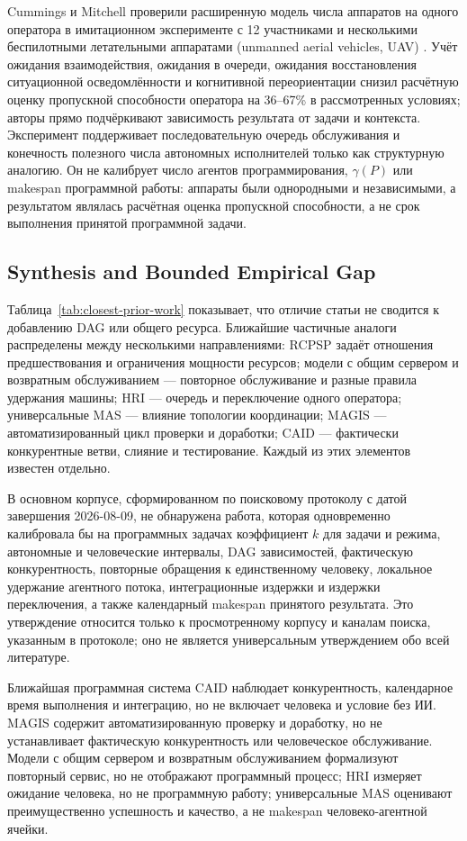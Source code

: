 Cummings и Mitchell проверили расширенную модель числа аппаратов на одного оператора в имитационном эксперименте с 12 участниками и несколькими беспилотными летательными аппаратами (unmanned aerial vehicles, UAV) \cite{cummings2008predicting}. Учёт ожидания взаимодействия, ожидания в очереди, ожидания восстановления ситуационной осведомлённости и когнитивной переориентации снизил расчётную оценку пропускной способности оператора на 36--67\% в рассмотренных условиях; авторы прямо подчёркивают зависимость результата от задачи и контекста. Эксперимент поддерживает последовательную очередь обслуживания и конечность полезного числа автономных исполнителей только как структурную аналогию. Он не калибрует число агентов программирования, $\gamma(P)$ или makespan программной работы: аппараты были однородными и независимыми, а результатом являлась расчётная оценка пропускной способности, а не срок выполнения принятой программной задачи.

\subsection{Synthesis and Bounded Empirical Gap}

Таблица~\ref{tab:closest-prior-work} показывает, что отличие статьи не сводится к добавлению DAG или общего ресурса. Ближайшие частичные аналоги распределены между несколькими направлениями: RCPSP задаёт отношения предшествования и ограничения мощности ресурсов; модели с общим сервером и возвратным обслуживанием --- повторное обслуживание и разные правила удержания машины; HRI --- очередь и переключение одного оператора; универсальные MAS --- влияние топологии координации; MAGIS --- автоматизированный цикл проверки и доработки; CAID --- фактически конкурентные ветви, слияние и тестирование. Каждый из этих элементов известен отдельно.

В основном корпусе, сформированном по поисковому протоколу с датой завершения 2026-08-09, не обнаружена работа, которая одновременно калибровала бы на программных задачах коэффициент $k$ для задачи и режима, автономные и человеческие интервалы, DAG зависимостей, фактическую конкурентность, повторные обращения к единственному человеку, локальное удержание агентного потока, интеграционные издержки и издержки переключения, а также календарный makespan принятого результата. Это утверждение относится только к просмотренному корпусу и каналам поиска, указанным в протоколе; оно не является универсальным утверждением обо всей литературе.

Ближайшая программная система CAID наблюдает конкурентность, календарное время выполнения и интеграцию, но не включает человека и условие без ИИ. MAGIS содержит автоматизированную проверку и доработку, но не устанавливает фактическую конкурентность или человеческое обслуживание. Модели с общим сервером и возвратным обслуживанием формализуют повторный сервис, но не отображают программный процесс; HRI измеряет ожидание человека, но не программную работу; универсальные MAS оценивают преимущественно успешность и качество, а не makespan человеко-агентной ячейки.

